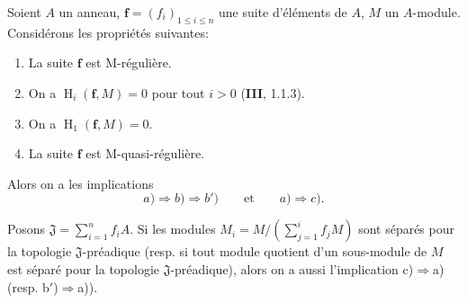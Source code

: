 \begin{theorem}[19.5.1]
\label{IV.19.5.1}
Soient $A$ un anneau, $\mathbf f=(f_i)_{1\leq i\leq n}$ une suite d'éléments de $A$, $M$ un $A$-module. Considérons les propriétés suivantes:
\begin{enumerate}
  \item[\textup{a)}] La suite $\mathbf f$ est M-régulière.
  \item[\textup{b)}] On a $\operatorname{H}_i(\mathbf f,M)=0$ pour tout $i>0$ \textup{(\textbf{III}, 1.1.3)}.
  \item[\textup{b$'$)}] On a $\operatorname{H}_1(\mathbf f,M)=0$.
  \item[\textup{c)}] La suite $\mathbf f$ est M-quasi-régulière.
\end{enumerate}

Alors on a les implications
\[
  \textit{a)}\Rightarrow\textit{b)}\Rightarrow\textit{b$'$)}\qquad\text{et}\qquad\textit{a)}\Rightarrow\textit{c)}.
\]

Posons $\mathfrak J=\sum_{i=1}^n f_iA$. Si les modules $M_i=M/(\sum_{j=1}^i f_jM)$ sont séparés pour la topologie $\mathfrak J$-préadique \textup{(resp.} si tout module quotient d'un sous-module de $M$ est séparé pour la topologie $\mathfrak J$-préadique), alors on a aussi l'implication \textup{c)}$\Rightarrow$\textup{a)} \textup{(resp. b$'$)}$\Rightarrow$\textup{a))}.
\end{theorem}

